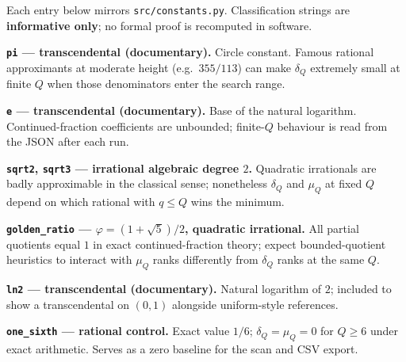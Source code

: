 \documentclass[
]{article}
\newcounter{none} %
\begin{document}
Each entry below mirrors \texttt{src/constants.py}. Classification
strings are \textbf{informative only}; no formal proof is recomputed in
software.

\textbf{\texttt{pi} --- transcendental (documentary).} Circle constant.
Famous rational approximants at moderate height (e.g.~\(355/113\)) can
make \(\delta_Q\) extremely small at finite \(Q\) when those
denominators enter the search range.

\textbf{\texttt{e} --- transcendental (documentary).} Base of the
natural logarithm. Continued-fraction coefficients are unbounded;
finite-\(Q\) behaviour is read from the JSON after each run.

\textbf{\texttt{sqrt2}, \texttt{sqrt3} --- irrational algebraic degree
\(2\).} Quadratic irrationals are badly approximable in the classical
sense; nonetheless \(\delta_Q\) and \(\mu_Q\) at fixed \(Q\) depend on
which rational with \(q\le Q\) wins the minimum.

\textbf{\texttt{golden\_ratio} --- \(\varphi=(1+\sqrt5)/2\), quadratic
irrational.} All partial quotients equal \(1\) in exact
continued-fraction theory; expect bounded-quotient heuristics to
interact with \(\mu_Q\) ranks differently from \(\delta_Q\) ranks at the
same \(Q\).

\textbf{\texttt{ln2} --- transcendental (documentary).} Natural
logarithm of \(2\); included to show a transcendental on \((0,1)\)
alongside uniform-style references.

\textbf{\texttt{one\_sixth} --- rational control.} Exact value \(1/6\);
\(\delta_Q=\mu_Q=0\) for \(Q\ge 6\) under exact arithmetic. Serves as a
zero baseline for the scan and CSV export.




\end{document}
